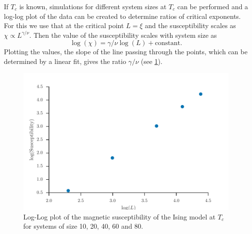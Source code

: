 \documentclass[11pt, a4paper]{report} %
\begin{document}
If \(T_c\) is known, simulations for different system sizes at \(T_c\) can be performed and a log-log plot of the data can be created to determine ratios of critical exponents.
For this we use that at the critical point \(L = \xi\) and the susceptibility scales as \(\chi \propto L^{\gamma/\nu}\).
Then the value of the susceptibility scales with system size as
\begin{equation}
	\log(\chi) = \gamma/\nu \log(L) + \mathrm{constant}.
\end{equation}
Plotting the values, the slope of the line passing through the points, which can be determined by a linear fit, gives the ratio \(\gamma/\nu\) (see \cref{fig:ising_magnetizabilities_loglog_plot}).\cite{corboz}

\begin{figure}[htb]
	\centering
	\includegraphics[width=\textwidth]{ising_magnetizabilities_loglog_plot.pdf}
	\caption{Log-Log plot of the magnetic susceptibility of the Ising model at \(T_c\) for systems of size 10, 20, 40, 60 and 80.}
	\label{fig:ising_magnetizabilities_loglog_plot}
\end{figure}
\end{document}
